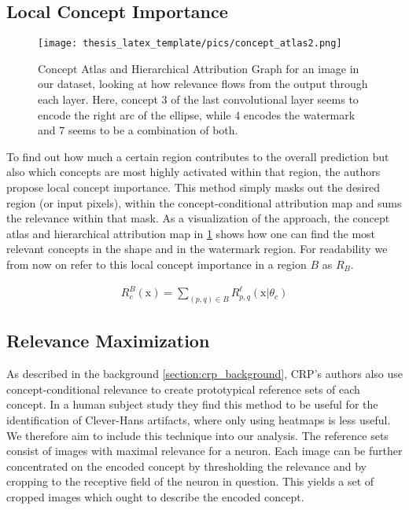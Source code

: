 \subsection{Local Concept Importance}
 \begin{figure}[t!]
    \centering  
	\texttt{[image: thesis\_latex\_template/pics/concept\_atlas2.png]}
    \caption[Concept Atlas and Hierarchical Attribution Graph]{Concept Atlas and Hierarchical Attribution Graph for an image in our dataset, looking at how relevance flows from the output through each layer. Here, concept 3 of the last convolutional layer seems to encode the right arc of the ellipse, while 4 encodes the watermark and 7 seems to be a combination of both. }
    \label{fig:attr_graph}
    \end{figure}
To find out how much a certain region contributes to the overall prediction but also which concepts are most highly activated within that region, the authors propose local concept importance. 
This method simply masks out the desired region (or input pixels), within the concept-conditional attribution map and sums the relevance within that mask. As a visualization of the approach, the concept atlas and hierarchical attribution map in \cref{fig:attr_graph} shows how one can find the most relevant concepts in the shape and in the watermark region. 
For readability we from now on refer to this local concept importance in a region $B$ as $R_B$.

\begin{align}\label{eq:local_importance}
    R_{c}^{B}(\mathrm{x}) = \sum_{(p,q) \in B} R_{p,q}^{\ell}(\mathrm{x} | \theta_c)
\end{align}

\subsection{Relevance Maximization}
As described in the background \cref{section:crp_background}, CRP's authors also use concept-conditional relevance to create prototypical reference sets of each concept. In a human subject study \citep{Achtibat2023} they find this method to be useful for the identification of Clever-Hans artifacts, where only using heatmaps is less useful. We therefore aim to include this technique into our analysis. The reference sets consist of images with maximal relevance for a neuron. Each image can be further concentrated on the encoded concept by thresholding the relevance and by cropping to the receptive field of the neuron in question. This yields a set of cropped images which ought to describe the encoded concept. 

